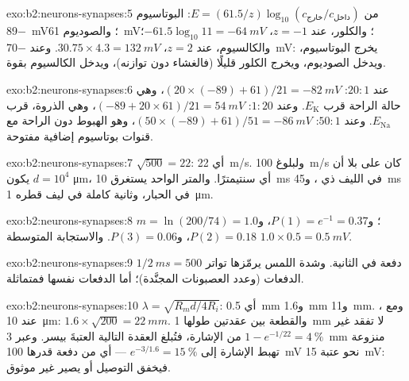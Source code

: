 \begin{solution}{exo:b2:neurons-synapses:5}
\begingroup\sloppy
من $E = (61.5/z)\log_{10}(c_{\text{خارج}}/c_{\text{داخل}})$:
البوتاسيوم \qty{-89}{mV}؛ والصوديوم \qty{+61}{mV}؛ والكلور، عند $z =
-1$، $-61.5\log_{10} 11 = \qty{-64}{mV}$؛ والكالسيوم، عند $z = 2$،
$30.75\times 4.3 = \qty{+132}{mV}$. وعند \qty{-70}{mV}:
يخرج البوتاسيوم، ويدخل الصوديوم، ويخرج الكلور قليلًا (فالغشاء
دون توازنه)، ويدخل الكالسيوم بقوة.
\par\endgroup
\end{solution}

\begin{solution}{exo:b2:neurons-synapses:6}
عند $20 : 1$: $(20\times(-89) + 61)/21 = \qty{-82}{mV}$، وهي حالة
الراحة قرب $E_{\mathrm K}$. وعند $1 : 20$: $(-89 + 20\times 61)/21 =
\qty{+54}{mV}$، وهي الذروة، قرب $E_{\mathrm{Na}}$. وعند $50 : 1$: $(50\times
(-89) + 61)/51 = \qty{-86}{mV}$، وهو الهبوط دون الراحة مع قنوات بوتاسيوم
إضافية مفتوحة.
\end{solution}

\begin{solution}{exo:b2:neurons-synapses:7}
$\sqrt{500} = 22$: أي \qty{22}{m/s}. ولبلوغ \qty{100}{m/s} كان على
 بلا  أن يكون $d = 10^{4}$ \unit{\micro m}، أي
سنتيمترًا. والمتر الواحد يستغرق \qty{10}{ms} في الليف ذي ،
و\qty{45}{ms} في  الحبار، وثانية كاملة في ليف قطره \qty{1}{\micro m}.
\end{solution}

\begin{solution}{exo:b2:neurons-synapses:8}
$m = \ln(200/74) = 1.0$؛ و$P(1) = e^{-1} = 0.37$، و$P(2) = 0.18$، و$P(3)
= 0.06$. والاستجابة المتوسطة $1.0\times 0.5 = \qty{0.5}{mV}$.
\end{solution}

\begin{solution}{exo:b2:neurons-synapses:9}
$1/\qty{2}{ms} = 500$ دفعة في الثانية. وشدة اللمس
يرمّزها تواتر الدفعات (وعدد العصبونات
المجنَّدة)؛ أما الدفعات نفسها فمتماثلة.
\end{solution}

\begin{solution}{exo:b2:neurons-synapses:10}
$\lambda = \sqrt{R_m d/4R_i}$: أي \qty{0.5}{mm} و\qty{1.6}{mm}
و\qty{11}{mm}. ومع ، عند \qty{10}{\micro m}: $1.6\times\sqrt{200} =
\qty{22}{mm}$. والقطعة بين عقدتين طولها \qty{1}{mm} لا تفقد غير $1 - e^{-1/22}
= \qty{4}{\%}$ من الإشارة، فتُبلغ العقدة التالية العتبةَ
بيسر. وعبر \qty{3}{mm} منزوعة  تهبط الإشارة إلى
$e^{-3/1.6} = \qty{15}{\%}$ --- أي من دفعة قدرها \qty{100}{mV} نحو
عتبة \qty{15}{mV}: فيخفق التوصيل أو يصير غير موثوق.
\end{solution}

